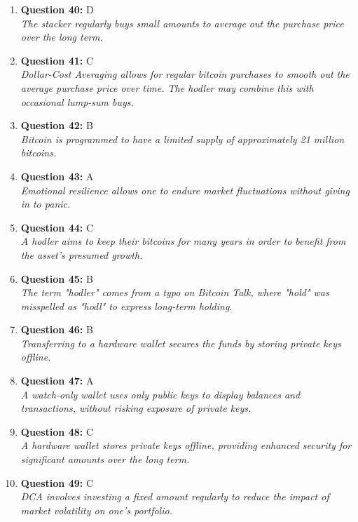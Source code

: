 \documentclass[12pt,a4paper]{article}
\begin{document}
\begin{enumerate}
\item \textbf{Question 40:} D
\\ \textit{The stacker regularly buys small amounts to average out the purchase price over the long term.}

\item \textbf{Question 41:} C
\\ \textit{Dollar-Cost Averaging allows for regular bitcoin purchases to smooth out the average purchase price over time. The hodler may combine this with occasional lump-sum buys.}

\item \textbf{Question 42:} B
\\ \textit{Bitcoin is programmed to have a limited supply of approximately 21 million bitcoins.}

\item \textbf{Question 43:} A
\\ \textit{Emotional resilience allows one to endure market fluctuations without giving in to panic.}

\item \textbf{Question 44:} C
\\ \textit{A hodler aims to keep their bitcoins for many years in order to benefit from the asset’s presumed growth.}

\item \textbf{Question 45:} B
\\ \textit{The term "hodler" comes from a typo on Bitcoin Talk, where "hold" was misspelled as "hodl" to express long-term holding.}

\item \textbf{Question 46:} B
\\ \textit{Transferring to a hardware wallet secures the funds by storing private keys offline.}

\item \textbf{Question 47:} A
\\ \textit{A watch-only wallet uses only public keys to display balances and transactions, without risking exposure of private keys.}

\item \textbf{Question 48:} C
\\ \textit{A hardware wallet stores private keys offline, providing enhanced security for significant amounts over the long term.}

\item \textbf{Question 49:} C
\\ \textit{DCA involves investing a fixed amount regularly to reduce the impact of market volatility on one's portfolio.}


\end{enumerate}
\end{document}
